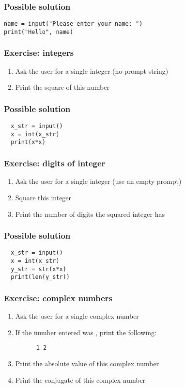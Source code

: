 \documentclass[14pt,compress]{beamer}
\begin{document}
\begin{frame}
\frametitle{Possible solution}
\begin{lstlisting}
name = input("Please enter your name: ")
print("Hello", name)
\end{lstlisting}

\end{frame}

\begin{frame}[plain]
  \frametitle{Exercise: integers}
  \begin{enumerate}
  \item Ask the user for a single integer (no prompt string)
  \item Print the square of this number
  \end{enumerate}
\end{frame}

\begin{frame}
\frametitle{Possible solution}
\begin{lstlisting}
  x_str = input()
  x = int(x_str)
  print(x*x)
\end{lstlisting}

\end{frame}


\begin{frame}[plain]
  \frametitle{Exercise: digits of integer}
  \begin{enumerate}
  \item Ask the user for a single integer (use an empty prompt)
  \item Square this integer
  \item Print the number of digits the squared integer has
  \end{enumerate}
\end{frame}

\begin{frame}
\frametitle{Possible solution}
\begin{lstlisting}
  x_str = input()
  x = int(x_str)
  y_str = str(x*x)
  print(len(y_str))
\end{lstlisting}

\end{frame}

\begin{frame}
  \frametitle{Exercise: complex numbers}
  \begin{enumerate}
  \item Ask the user for a single complex number
  \item If the number entered was , print the following:
    \begin{lstlisting}
      1 2
    \end{lstlisting}
  \item Print the absolute value of this complex number
  \item Print the conjugate of this complex number
  \end{enumerate}
\end{frame}
\end{document}
